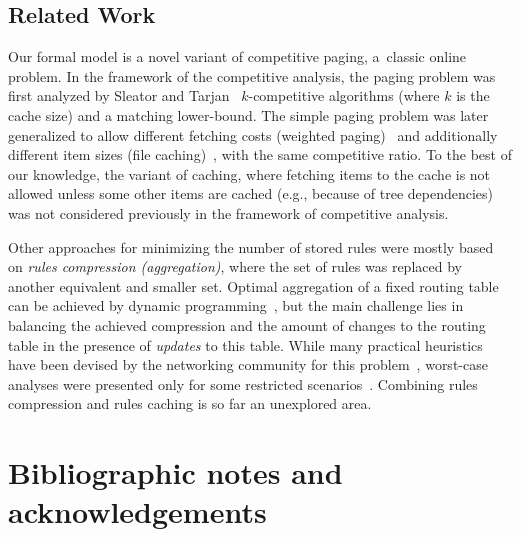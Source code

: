 \subsection{Related Work}

Our formal model is a novel variant of competitive paging, a~classic online
problem. In the framework of the competitive analysis, the paging problem was
first analyzed  by Sleator and Tarjan~\cite{competitive-analysis} $k$-competitive algorithms (where $k$ is the cache size) and a matching lower-bound.
The simple paging problem was later generalized to allow different fetching
costs (weighted paging)~\cite{double-coverage,young-paging-greedy-dual} and
additionally different item sizes (file caching)~\cite{young-paging-landlord},
with the same competitive ratio.
To the best of our knowledge, the variant of caching, where fetching items to
the cache is not allowed unless some other items are cached (e.g., because of 
tree dependencies) was 
not considered previously in the framework of competitive analysis.

Other approaches for minimizing the number of stored rules were mostly based
on \emph{rules compression (aggregation)}, where the set of rules was replaced
by another equivalent and smaller set. Optimal aggregation of a fixed routing
table can be achieved by dynamic
programming~\cite{ortc,fib-compression-two-dimensional}, but the main
challenge lies in balancing the achieved compression and the amount of changes
to the routing table in the presence of \emph{updates} to this table. While
many practical heuristics have been devised by the networking community for
this problem~\cite{mms,fib-compression-fifa,fib-compression-globecom10,fib-compression-infocom13,fib-sigcomm,fib-compression-smalta,fib-compression-infocom10},
worst-case analyses were presented only for some restricted
scenarios~\cite{fib-icdcs,fib-sirocco}. Combining rules compression and rules
caching is so far an unexplored area.




\section{Bibliographic notes and acknowledgements}

